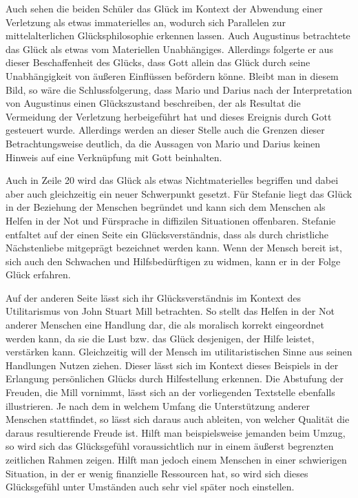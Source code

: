 Auch sehen die beiden Schüler das Glück im Kontext der Abwendung einer Verletzung als etwas immaterielles an, wodurch sich Parallelen zur mittelalterlichen Glücksphilosophie erkennen lassen. 
Auch Augustinus betrachtete das Glück als etwas vom Materiellen Unabhängiges. 
Allerdings folgerte er aus dieser Beschaffenheit des Glücks, dass Gott allein das Glück durch seine Unabhängigkeit von äußeren Einflüssen befördern könne. 
Bleibt man in diesem Bild, so wäre die Schlussfolgerung, dass Mario und Darius nach der Interpretation von Augustinus einen Glückszustand beschreiben, der als Resultat die Vermeidung der Verletzung herbeigeführt hat und dieses Ereignis durch Gott gesteuert wurde. 
Allerdings werden an dieser Stelle auch die Grenzen dieser Betrachtungsweise deutlich, da die Aussagen von Mario und Darius keinen Hinweis auf eine Verknüpfung mit Gott beinhalten.

Auch in Zeile 20 wird das Glück als etwas Nichtmaterielles begriffen und dabei aber auch gleichzeitig ein neuer Schwerpunkt gesetzt. 
Für Stefanie liegt das Glück in der Beziehung der Menschen begründet und kann sich dem Menschen als Helfen in der Not und Fürsprache in diffizilen Situationen offenbaren.
 Stefanie entfaltet auf der einen Seite ein Glücksverständnis, dass als durch christliche Nächstenliebe mitgeprägt bezeichnet werden kann. 
 Wenn der Mensch bereit ist, sich auch den Schwachen und Hilfsbedürftigen zu widmen, kann er in der Folge Glück erfahren. 
 
 Auf der anderen Seite lässt sich ihr Glücksverständnis im Kontext des Utilitarismus von John Stuart Mill betrachten. 
 So stellt das Helfen in der Not anderer Menschen eine Handlung dar, die als moralisch korrekt eingeordnet werden kann, da sie die Lust bzw. das Glück desjenigen, der Hilfe leistet, verstärken kann. 
 Gleichzeitig will der Mensch im utilitaristischen Sinne aus seinen Handlungen Nutzen ziehen. 
 Dieser lässt sich im Kontext dieses Beispiels in der Erlangung persönlichen Glücks durch Hilfestellung erkennen. 
 Die Abstufung der Freuden, die Mill vornimmt, lässt sich an der vorliegenden Textstelle ebenfalls illustrieren. 
 Je nach dem in welchem Umfang die Unterstützung anderer Menschen stattfindet, so lässt sich daraus auch ableiten, von welcher Qualität die daraus resultierende Freude ist. 
 Hilft man beispielsweise jemanden beim Umzug, so wird sich das Glücksgefühl voraussichtlich nur in einem äußerst begrenzten zeitlichen Rahmen zeigen. 
 Hilft man jedoch einem Menschen in einer schwierigen Situation, in der er wenig finanzielle Ressourcen hat, so wird sich dieses Glücksgefühl unter Umständen auch sehr viel später noch einstellen.
 
